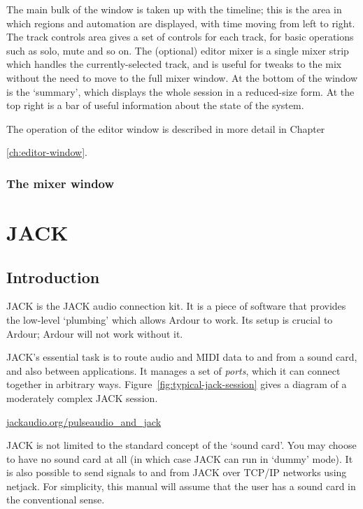 \documentclass[10pt,a4paper]{book}
\begin{document}
The main bulk of the window is taken up with the timeline; this is the
area in which regions and automation are displayed, with time moving
from left to right.  The track controls area gives a set of controls
for each track, for basic operations such as solo, mute and so on.
The (optional) editor mixer is a single mixer strip which handles the
currently-selected track, and is useful for tweaks to the mix without
the need to move to the full mixer window.  At the bottom of the
window is the `summary', which displays the whole session in a
reduced-size form.  At the top right is a bar of useful information
about the state of the system.

The operation of the editor window is described in more detail in
Chapter~{\ref{ch:editor-window}.

\subsection{The mixer window}






\chapter{JACK}
\label{ch:jack}

\section{Introduction}

JACK is the JACK audio connection kit.  It is a piece of software that
provides the low-level `plumbing' which allows Ardour to work.  Its
setup is crucial to Ardour; Ardour will not work without it.

JACK's essential task is to route audio and MIDI data to and from a
sound card, and also between applications.  It manages a set of
\emph{ports}, which it can connect together in arbitrary ways.
Figure~\ref{fig:typical-jack-session} gives a diagram of a moderately
complex JACK session.

\url{jackaudio.org/pulseaudio_and_jack}

\begin{danger}
JACK is not limited to the standard concept of the `sound card'.  You
may choose to have no sound card at all (in which case JACK can run in
`dummy' mode).  It is also possible to send signals to and from JACK
over TCP/IP networks using netjack.  For simplicity, this manual will
assume that the user has a sound card in the conventional sense.
\end{danger}

}
\end{document}
